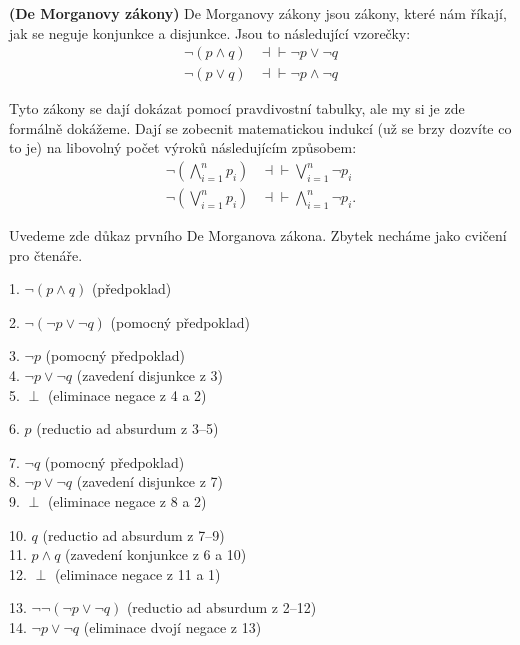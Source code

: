 \begin{example} \textbf{(De Morganovy zákony)}
  De Morganovy zákony jsou zákony, které nám říkají, jak se neguje konjunkce a disjunkce. Jsou to následující vzorečky:
  \begin{equation}
    \begin{aligned}
      \neg (p \land q) &\dashv\vdash \neg p \lor \neg q \\
      \neg (p \lor q) &\dashv\vdash \neg p \land \neg q
    \end{aligned}
  \end{equation}

  Tyto zákony se dají dokázat pomocí pravdivostní tabulky, ale my si je zde formálně dokážeme. Dají se zobecnit matematickou indukcí (už se brzy dozvíte co to je) na libovolný počet výroků následujícím způsobem:
  \begin{equation}
    \begin{aligned}
      \neg \left(\bigwedge_{i=1}^{n} p_i\right) &\dashv\vdash \bigvee_{i=1}^{n} \neg p_i \\
      \neg \left(\bigvee_{i=1}^{n} p_i\right) &\dashv\vdash \bigwedge_{i=1}^{n} \neg p_i.
    \end{aligned}
  \end{equation}

  Uvedeme zde důkaz prvního De Morganova zákona. Zbytek necháme jako cvičení pro čtenáře.

  \begin{proofbox}

    1. $\neg (p \land q)$ (předpoklad)
    \begin{proofbox}
      2. $\neg(\neg p \lor \neg q)$ (pomocný předpoklad)
      \begin{proofbox}
        3. $\neg p$ (pomocný předpoklad) \\
        4. $\neg p \lor \neg q$ (zavedení disjunkce z 3) \\
        5. $\perp$ (eliminace negace z 4 a 2)
      \end{proofbox}
      6. $p$ (reductio ad absurdum z 3--5) 
      \begin{proofbox}
        7. $\neg q$ (pomocný předpoklad) \\
        8. $\neg p \lor \neg q$ (zavedení disjunkce z 7) \\
        9. $\perp$ (eliminace negace z 8 a 2)
      \end{proofbox}
      10. $q$ (reductio ad absurdum z 7--9) \\
      11. $p \land q$ (zavedení konjunkce z 6 a 10) \\
      12. $\perp$ (eliminace negace z 11 a 1)
    \end{proofbox}
    13. $\neg\neg(\neg p \lor \neg q)$ (reductio ad absurdum z 2--12) \\
    14. $\neg p \lor \neg q$ (eliminace dvojí negace z 13)
  \end{proofbox}


\end{example}
